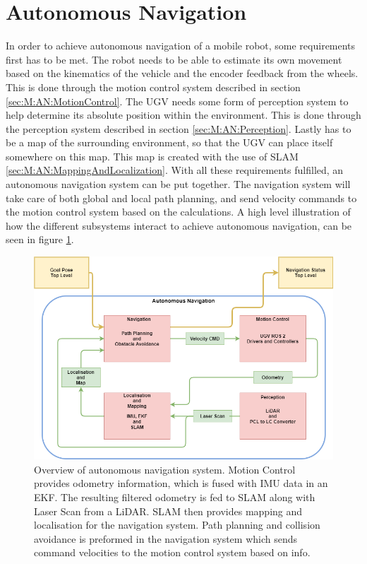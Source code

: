\section{Autonomous Navigation}
In order to achieve autonomous navigation of a mobile robot, some requirements first has to be met. The robot needs to be able to estimate its own movement based on the kinematics of the vehicle and the encoder feedback from the wheels. This is done through the motion control system described in section \ref{sec:M:AN:MotionControl}. The UGV needs some form of perception system to help determine its absolute position within the environment. This is done through the perception system described in section \ref{sec:M:AN:Perception}. Lastly has to be a map of the surrounding environment, so that the UGV can place itself somewhere on this map. This map is created with the use of SLAM \ref{sec:M:AN:MappingAndLocalization}. With all these requirements fulfilled, an autonomous navigation system can be put together. The navigation system will take care of both global and local path planning, and send velocity commands to the motion control system based on the calculations. A high level illustration of how the different subsystems interact to achieve autonomous navigation, can be seen in figure \ref{fig:M:AN:ANMethod}.

\begin{figure}[H]
  \centering
  \includegraphics[width = 1\textwidth]{Figures/figANMethod.drawio.png}
  \caption{Overview of autonomous navigation system. Motion Control provides odometry information, which is fused with IMU data in an EKF. The resulting filtered odometry is fed to SLAM along with Laser Scan from a LiDAR. SLAM then provides mapping and localisation for the navigation system. Path planning and collision avoidance is preformed in the navigation system which sends command velocities to the motion control system based on info.}
  \label{fig:M:AN:ANMethod}
\end{figure}

